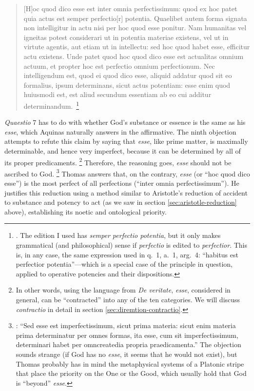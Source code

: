 \begin{quotation}
[H]oc quod dico esse est inter omnia perfectissimum: quod ex hoc patet quia actus est semper perfectio[r] potentia. Quaelibet autem forma signata non intelligitur in actu nisi per hoc quod esse ponitur. Nam humanitas vel igneitas potest considerari ut in potentia materiae existens, vel ut in virtute agentis, aut etiam ut in intellectu: sed hoc quod habet esse, efficitur actu existens. Unde patet quod hoc quod dico esse est actualitas omnium actuum, et propter hoc est perfectio omnium perfectionum. Nec intelligendum est, quod ei quod dico esse, aliquid addatur quod sit eo formalius, ipsum determinans, sicut actus potentiam: esse enim quod huiusmodi est, est aliud secundum essentiam ab eo cui additur determinandum.\,%
%
\footnote{\Cite[q.~7, a.~2 ad~9]{st:depotentia}. The edition I used has \emph{semper perfectio potentia}, but it only makes grammatical (and philosophical) sense if \emph{perfectio} is edited to \emph{perfectior}. This is, in any case, the same expression used in q.~1, a.~1, arg.~4: “habitus est perfectior potentia”—which is a special case of the principle in question, applied to operative potencies and their dispositions.}
\end{quotation}
%
\emph{Quaestio} 7 has to do with whether God’s substance or essence is the same as his \emph{esse}, which Aquinas naturally answers in the affirmative. The ninth objection attempts to refute this claim by saying that \emph{esse}, like prime matter, is maximally determinable, and hence very imperfect, because it can be determined by all of its proper predicaments.%
\footnote{In other words, using the language from \emph{De veritate}, \emph{esse}, considered in general, can be “contracted” into any of the ten categories. We will discuss \emph{contractio} in detail in section \ref{sec:diremtion-contractio}.}
%
Therefore, the reasoning goes, \emph{esse} should not be ascribed to God.%
%
\footnote{\Cite[See][q.~7, a.~2 ad~9]{st:depotentia}: “Sed esse est imperfectissimum, sicut prima materia: sicut enim materia prima determinatur per omnes formas, ita esse, cum sit imperfectissimum, determinari habet per omncreatedia propria praedicamenta.” The objection sounds strange (if God has no \emph{esse}, it seems that he would not exist), but Thomas probably has in mind the metaphysical systems of a Platonic stripe that place the priority on the One or the Good, which usually hold that  God is “beyond” \emph{esse}.} Thomas answers that, on the contrary, \emph{esse} (or “hoc quod dico esse”) is the most perfect of all perfections (“inter omnia perfectissimum”). He justifies this reduction using a method similar to Aristotle’s reduction of accident to substance and potency to act (as we saw in section \ref{sec:aristotle-reduction} above), establishing its noetic and ontological priority.%
